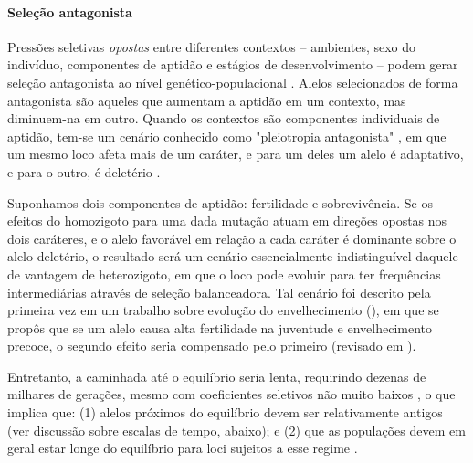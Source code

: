 \begin{refsection}
\paragraph{Seleção antagonista} %



	Pressões seletivas \emph{opostas} entre diferentes contextos -- ambientes, sexo do indivíduo, componentes de aptidão e estágios de desenvolvimento -- podem gerar seleção antagonista ao nível genético-populacional \parencite{Connallon2013,Prout2000}. Alelos selecionados de forma antagonista são aqueles que aumentam a aptidão em um contexto, mas diminuem-na em outro. Quando os contextos são componentes individuais de aptidão, tem-se um cenário conhecido como "pleiotropia antagonista" \label{text:pleiotropia}, em que um mesmo loco afeta mais de um caráter, e para um deles um alelo é adaptativo, e para o outro, é deletério \parencite{Connallon2013}.
%

	Suponhamos dois componentes de aptidão: fertilidade e sobrevivência. Se os efeitos do homozigoto para uma dada mutação atuam em direções opostas nos dois caráteres, e o alelo favorável em relação a cada caráter é dominante sobre o alelo deletério, o resultado será um cenário essencialmente indistinguível daquele de vantagem de heterozigoto, em que o loco pode evoluir para ter frequências intermediárias através de seleção balanceadora. Tal cenário foi descrito pela primeira vez em um trabalho sobre evolução do envelhecimento (\cite{Williams1957}), em que se propôs que se um alelo causa alta fertilidade na juventude e envelhecimento precoce, o segundo efeito seria compensado pelo primeiro (revisado em \cite{Charlesworth2000}). 
 
	Entretanto, a caminhada até o equilíbrio seria lenta, requirindo dezenas de milhares de gerações, mesmo com coeficientes seletivos não muito baixos \parencite{Connallon2013}, o que implica que: (1) alelos próximos do equilíbrio devem ser relativamente antigos (ver discussão sobre escalas de tempo, abaixo); e (2) que as populações devem em geral estar longe do equilíbrio para loci sujeitos a esse regime \parencite{Connallon2013}.



\end{refsection}
